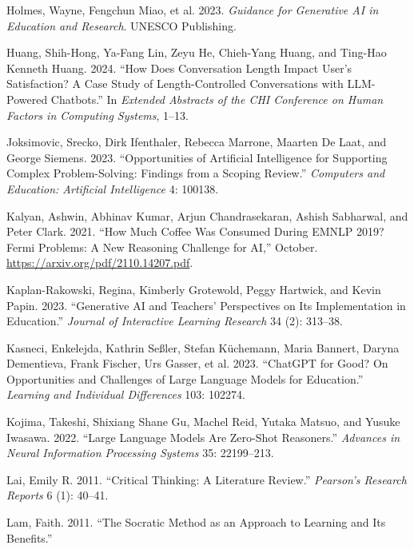 \documentclass[
  12pt,
]{article}
\newlength{\cslhangindent}
\newenvironment{CSLReferences}[2] %
 {\begin{list}{}{%
  \setlength{\itemindent}{0pt}
  \setlength{\leftmargin}{0pt}
  \setlength{\parsep}{0pt}
  \ifodd #1
   \setlength{\leftmargin}{\cslhangindent}
   \setlength{\itemindent}{-1\cslhangindent}
  \fi
  \setlength{\itemsep}{#2\baselineskip}}}
 {\end{list}}
\begin{document}
\begin{CSLReferences}{1}{0}
Holmes, Wayne, Fengchun Miao, et al. 2023. \emph{Guidance for Generative AI in Education and Research}. UNESCO Publishing.

Huang, Shih-Hong, Ya-Fang Lin, Zeyu He, Chieh-Yang Huang, and Ting-Hao Kenneth Huang. 2024. {``How Does Conversation Length Impact User's Satisfaction? A Case Study of Length-Controlled Conversations with LLM-Powered Chatbots.''} In \emph{Extended Abstracts of the CHI Conference on Human Factors in Computing Systems}, 1--13.

Joksimovic, Srecko, Dirk Ifenthaler, Rebecca Marrone, Maarten De Laat, and George Siemens. 2023. {``Opportunities of Artificial Intelligence for Supporting Complex Problem-Solving: Findings from a Scoping Review.''} \emph{Computers and Education: Artificial Intelligence} 4: 100138.

Kalyan, Ashwin, Abhinav Kumar, Arjun Chandrasekaran, Ashish Sabharwal, and Peter Clark. 2021. {``How Much Coffee Was Consumed During EMNLP 2019? Fermi Problems: A New Reasoning Challenge for AI,''} October. \url{https://arxiv.org/pdf/2110.14207.pdf}.

Kaplan-Rakowski, Regina, Kimberly Grotewold, Peggy Hartwick, and Kevin Papin. 2023. {``Generative AI and Teachers' Perspectives on Its Implementation in Education.''} \emph{Journal of Interactive Learning Research} 34 (2): 313--38.

Kasneci, Enkelejda, Kathrin Seßler, Stefan Küchemann, Maria Bannert, Daryna Dementieva, Frank Fischer, Urs Gasser, et al. 2023. {``ChatGPT for Good? On Opportunities and Challenges of Large Language Models for Education.''} \emph{Learning and Individual Differences} 103: 102274.

Kojima, Takeshi, Shixiang Shane Gu, Machel Reid, Yutaka Matsuo, and Yusuke Iwasawa. 2022. {``Large Language Models Are Zero-Shot Reasoners.''} \emph{Advances in Neural Information Processing Systems} 35: 22199--213.

Lai, Emily R. 2011. {``Critical Thinking: A Literature Review.''} \emph{Pearson's Research Reports} 6 (1): 40--41.

Lam, Faith. 2011. {``The Socratic Method as an Approach to Learning and Its Benefits.''}


\end{CSLReferences}
\end{document}
